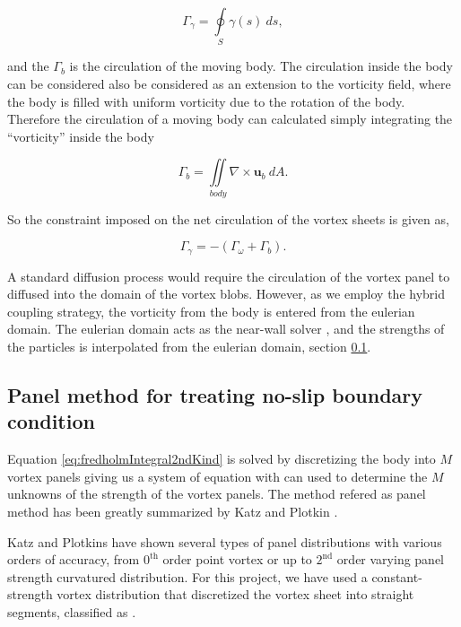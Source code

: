 	\begin{equation}
	\Gamma_{\gamma} = \oint\limits_S\gamma\left(s\right)\ d s,
	\end{equation}	

and the $\Gamma_b$ is the circulation of the moving body. The circulation inside the body can be considered also be considered as an extension to the vorticity field, where the body is filled with uniform vorticity due to the rotation of the body. Therefore the circulation of a moving body can calculated simply integrating the ``vorticity'' inside the body

	\begin{equation}
	\Gamma_b = \iint\limits_{body} \nabla \times \mathbf{u}_b \ d A.
	\end{equation}	

So the constraint imposed on the net circulation of the vortex sheets is given as,

	\begin{equation}
	\Gamma_{\gamma} = - \left(\Gamma_{\omega} + \Gamma_b\right).
	\end{equation}	

A standard diffusion process would require the circulation of the vortex panel to diffused into the domain of the vortex blobs. However, as we employ the hybrid coupling strategy, the vorticity from the body is entered from the eulerian domain. The eulerian domain acts as the near-wall solver \cite{Daeninck2006}, and the strengths of the particles is interpolated from the eulerian domain, section \ref{}.


\subsection{Panel method for treating no-slip boundary condition}
Equation \ref{eq:fredholmIntegral2ndKind} is solved by discretizing the body into $M$ vortex panels giving us a system of equation with can used to determine the $M$ unknowns of the strength of the vortex panels. The method refered as panel method has been greatly summarized by Katz and Plotkin \cite{Katz2001a}. 

Katz and Plotkins have shown several types of panel distributions with various orders of accuracy, from $0^{\mathrm{th}}$
order point vortex or up to $2^{\mathrm{nd}}$ order varying panel strength curvatured distribution. For this project, we have used a constant-strength vortex distribution that discretized the vortex sheet into straight segments, classified as .

